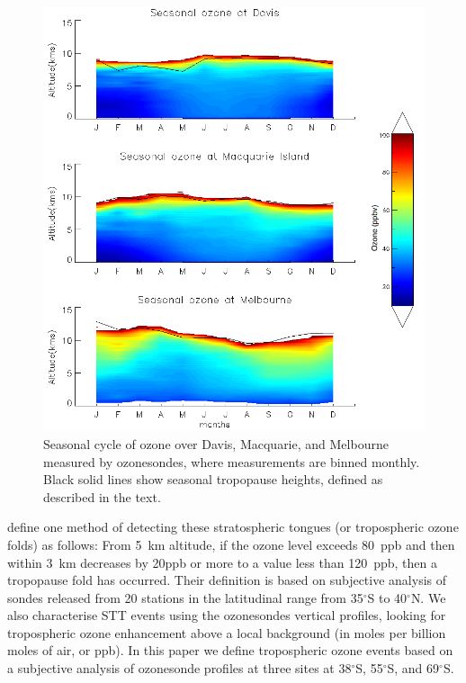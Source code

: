 \documentclass{article}
\begin{document}
    \begin{figure}[!htbp]
      \begin{center}
      \includegraphics[width=0.8\columnwidth]{figures/seasonaltropozone}
      \caption{
      Seasonal cycle of ozone over Davis, Macquarie, and Melbourne measured by ozonesondes, where measurements are binned monthly.
      Black solid lines show seasonal tropopause heights, defined as described in the text.
      }
      \label{fig:seasonaltropozone}
      \end{center}
    \end{figure}
    

    \citet{Tang2010} define one method of detecting these stratospheric tongues (or tropospheric ozone folds)  as follows: From 5~km altitude, if the ozone level exceeds 80~ppb and then within 3~km decreases by 20ppb or more to a value less than 120~ppb, then a tropopause fold has occurred.
    Their definition is based on subjective analysis of sondes released from 20 stations in the latitudinal range from 35$^\circ$S to 40$^\circ$N.
    We also characterise STT events using the ozonesondes vertical profiles, looking for tropospheric ozone enhancement above a local background (in moles per billion moles of air, or ppb).
    In this paper we define tropospheric ozone events based on a subjective analysis of ozonesonde profiles at three sites at 38$^\circ$S, 55$^\circ$S, and 69$^\circ$S.
    
\end{document}

